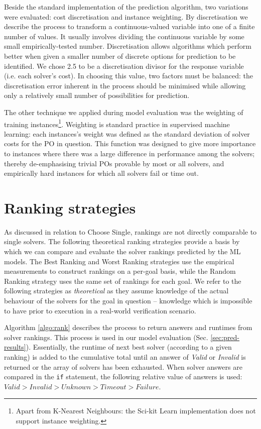 Beside the standard implementation of the prediction algorithm, two variations were evaluated: cost discretisation and instance weighting.
By discretisation we describe the process to transform a continuous-valued variable into one of a finite number of values. 
It usually involves dividing the continuous variable by some small empirically-tested number. 
Discretisation allows algorithms which perform better when given a smaller number of discrete options for prediction to be identified. 
We chose 2.5 to be a discretisation divisor for the response variable (i.e. each solver's cost).
In choosing this value, two factors must be balanced: the discretisation error inherent in the process should be minimised while allowing only a relatively small number of possibilities for prediction.

The other technique we applied during model evaluation was the weighting of training instances\footnote{Apart from K-Nearest Neighbours: the Sci-kit Learn implementation does not support instance weighting.}.
Weighting is standard practice in supervised machine learning: each instances's weight was defined as the standard deviation of solver costs for the PO in question. 
This function was designed to give more importance to instances where there was a large difference in performance among the solvers; thereby de-emphasising trivial POs provable by most or all solvers, and empirically hard instances for which all solvers fail or time out.  


\section{Ranking strategies}
\label{sec:strategies}

As discussed in relation to \textsf{Choose Single}, rankings are not directly comparable to single solvers. 
The following theoretical ranking strategies provide a basis by which we can compare and evaluate the solver rankings predicted by the ML models.
The \textsf{Best Ranking} and \textsf{Worst Ranking} strategies use the empirical measurements to construct rankings on a per-goal basis, while the \textsf{Random Ranking} strategy uses the same set of rankings for each goal.
We refer to the following strategies as \textit{theoretical} as they assume knowledge of the actual behaviour of the solvers for the goal in question -- knowledge which is impossible to have prior to execution in a real-world verification scenario.     

Algorithm \ref{algo:rank} describes the process to return answers and runtimes from solver rankings. This process is used in our model evaluation (Sec. \ref{sec:pred-results}).
Essentially, the runtime of next best solver (according to a given ranking) is added to the cumulative total until an answer of \textit{Valid} or \textit{Invalid} is returned or the array of solvers has been exhausted. 
When solver answers are compared in the \texttt{if} statement, the following relative value of answers is used: $Valid > Invalid > Unknown > Timeout > Failure$.

